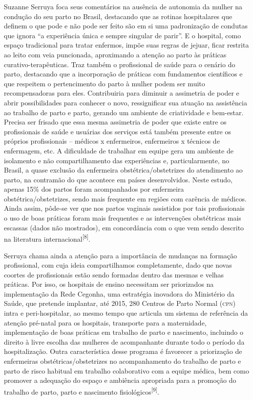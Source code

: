 \documentclass{article}
\begin{document}
Suzanne Serruya foca seus comentários na ausência de autonomia da mulher na
condução do
seu parto no Brasil, destacando que as rotinas hospitalares que definem o que
pode e não
pode ser feito são em si uma padronização de condutas que ignora “a experiência
única e
sempre singular de parir”. E o hospital, como espaço tradicional para tratar
enfermos,
impõe suas regras de jejuar, ficar restrita ao leito com veia puncionada,
aproximando a
atenção ao parto às práticas curativo-terapêuticas. Traz também o profissional
de saúde
para o cenário do parto, destacando que a incorporação de práticas com
fundamentos
científicos e que respeitem o pertencimento do parto à mulher podem ser muito
recompensadoras para eles. Contribuiria para diminuir a assimetria de poder e
abrir
possibilidades para conhecer o novo, ressignificar sua atuação na assistência ao
trabalho de parto e parto, gerando um ambiente de criatividade e bem-estar.
Precisa ser
frisado que essa mesma assimetria de poder que existe entre os profissionais de
saúde e
usuárias dos serviços está também presente entre os próprios profissionais –
médicos x
enfermeiros, enfermeiros x técnicos de enfermagem, etc. A dificuldade de
trabalhar em
equipe gera um ambiente de isolamento e não compartilhamento das experiências e,
particularmente, no Brasil, a quase exclusão da enfermeira
obstétrica/obstetrizes do
atendimento ao parto, na contramão do que acontece em países desenvolvidos.
Neste
estudo, apenas 15\% dos partos foram acompanhados por enfermeira
obstétrica/obstetrizes,
sendo mais frequente em regiões com carência de médicos. Ainda assim, pôde-se
ver que
nos partos vaginais assistidos por tais profissionais o uso de boas práticas
foram mais
frequentes e as intervenções obstétricas mais escassas (dados não mostrados), em
concordância com o que vem sendo descrito na literatura internacional\textsuperscript{[}\textsuperscript{8}\textsuperscript{]}.

Serruya chama ainda a atenção para a importância de mudanças na formação
profissional,
com cuja ideia compartilhamos completamente, dado que novas coortes de
profissionais
estão sendo formadas dentro das mesmas e velhas práticas. Por isso, os hospitais
de
ensino necessitam ser priorizados na implementação da Rede Cegonha, uma
estratégia
inovadora do Ministério da Saúde, que pretende implantar, até 2015, 280 Centros
de Parto
Normal (\textsc{cpn}) intra e peri-hospitalar, ao mesmo tempo que articula um sistema de
referência da atenção pré-natal para os hospitais, transporte para a
maternidade,
implementação de boas práticas em trabalho de parto e nascimento, incluindo o
direito à
livre escolha das mulheres de acompanhante durante todo o período da
hospitalização.
Outra característica desse programa é favorecer a priorização de enfermeiras
obstétricas/obstetrizes no acompanhamento do trabalho de parto e parto de risco
habitual
em trabalho colaborativo com a equipe médica, bem como promover a adequação do
espaço e
ambiência apropriada para a promoção do trabalho de parto, parto e nascimento
fisiológicos\textsuperscript{[}\textsuperscript{9}\textsuperscript{]}.
\end{document}
